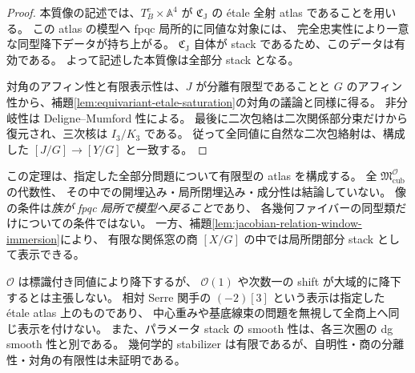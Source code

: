 \begin{proof}
本質像の記述では、$T_B^e\times\mathbb A^4$ が
$\mathfrak C_{\mathrm J}$ の étale 全射 atlas であることを用いる。
この atlas の模型へ fpqc 局所的に同値な対象には、
完全忠実性により一意な同型降下データが持ち上がる。
$\mathfrak C_{\mathrm J}$ 自体が stack であるため、このデータは有効である。
よって記述した本質像は全部分 stack となる。

対角のアフィン性と有限表示性は、$J$ が分離有限型であることと
$G$ のアフィン性から、補題\ref{lem:equivariant-etale-saturation}の対角の議論と同様に得る。
非分岐性は Deligne--Mumford 性による。
最後に二次包絡は二次関係部分束だけから復元され、三次核は $I_3/K_3$ である。
従って全同値に自然な二次包絡射は、構成した $[J/G]\to[Y/G]$ と一致する。
\end{proof}

\begin{remark}[大域降下と主張の境界]
この定理は、指定した全部分問題について有限型の atlas を構成する。
全 $\mathfrak M^{\mathcal O}_{\mathrm{cub}}$ の代数性、
その中での開埋込み・局所閉埋込み・成分性は結論していない。
像の条件は\emph{族が fpqc 局所で模型へ戻ること}であり、
各幾何ファイバーの同型類だけについての条件ではない。
一方、補題\ref{lem:jacobian-relation-window-immersion}により、
有限な関係窓の商 $[X/G]$ の中では局所閉部分 stack として表示できる。

$\mathcal O$ は標識付き同値により降下するが、
$\mathcal O(1)$ や次数一の shift が大域的に降下するとは主張しない。
相対 Serre 関手の $(-2)[3]$ という表示は指定した étale atlas 上のものであり、
中心重みや基底線束の問題を無視して全商上へ同じ表示を付けない。
また、パラメータ stack の smooth 性は、各三次圏の dg smooth 性と別である。
幾何学的 stabilizer は有限であるが、自明性・商の分離性・対角の有限性は未証明である。
\end{remark}
